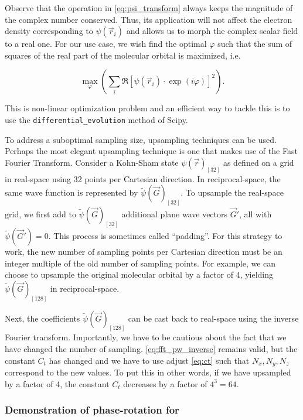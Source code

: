 Observe that the operation in \cref{eq:psi_transform} always keeps the magnitude of the complex number conserved. Thus, its application will not affect the electron density corresponding to $\psi(\vec{r}_{i})$ and allows us to morph the complex scalar field to a real one. For our use case, we wish find the optimal $\varphi$ such that the sum of squares of the real part of the molecular orbital is maximized, i.e.

\begin{equation}
    \max_\varphi \left(\sum_{i}\mathfrak{R}\left[ \psi(\vec{r}_{i}) \cdot \exp \left(i \varphi \right)\right]^{2} \right).
    \label{eq:optimize_real}
\end{equation}

This is non-linear optimization problem and an efficient way to tackle this is to use the \texttt{differential\_evolution} method of Scipy.\cite{differential_evolution}

To address a suboptimal sampling size, upsampling techniques can be used. Perhaps the most elegant upsampling technique is one that makes use of the Fast Fourier Transform. Consider a Kohn-Sham state $\psi(\vec{r})_{[32]}$ as defined on a grid in real-space using 32 points per Cartesian direction. In reciprocal-space, the same wave function is represented by $\tilde{\psi}(\vec{G})_{[32]}$. To upsample the real-space grid, we first add to $\tilde{\psi}(\vec{G})_{[32]}$ additional plane wave vectors $\vec{G}\prime$, all with $\tilde{\psi}(\vec{G}\prime) = 0$. This process is sometimes called ``padding''. For this strategy to work, the new number of sampling points per Cartesian direction must be an integer multiple of the old number of sampling points. For example, we can choose to upsample the original molecular orbital by a factor of 4, yielding $\tilde{\psi}(\vec{G})_{[128]}$ in reciprocal-space.

Next, the coefficients $\tilde{\psi}(\vec{G})_{[128]}$ can be cast back to real-space using the inverse Fourier transform. Importantly, we have to be cautious about the fact that we have changed the number of sampling. \cref{eq:fft_pw_inverse} remains valid, but the constant $C_{t}$ has changed and we have to use adjust \cref{eq:ct} such that $N_{x},N_{y},N_{z}$ correspond to the new values. To put this in other words, if we have upsampled by a factor of 4, the constant $C_{t}$ decreases by a factor of $4^{3}=64$.

%
%
%
\subsubsection{Demonstration of phase-rotation for }

